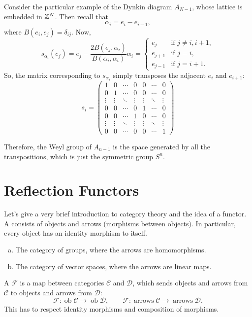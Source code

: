 \documentclass[oneside]{scrbook}
\begin{document}
Consider the particular example of the Dynkin diagram $A_{N-1}$, whose lattice is embedded in $\mathbb Z^N$. Then recall that
\[\alpha_i=e_i-e_{i+1},\]
where $B(e_i,e_j)=\delta_{ij}$. Now,
\[s_{\alpha_i}(e_j)=e_j-\frac{2B(e_j,\alpha_i)}{B(\alpha_i,\alpha_i)}\alpha_i=\begin{cases}
e_j & \text{if }j\neq i,i+1,\\
e_{j+1} & \text{if }j=i,\\
e_{j-1} & \text{if } j=i+1.
\end{cases}\]
So, the matrix corresponding to $s_{\alpha_i}$ simply transposes the adjacent $e_i$ and $e_{i+1}$:
\[s_i=\begin{pmatrix}
1 & 0 & \cdots & 0 & 0 & \cdots & 0\\
0 & 1 & \cdots & 0 & 0 & \cdots & 0\\
\vdots & \vdots & \ddots & \vdots & \vdots & \ddots & \vdots\\
0 & 0 & \cdots & 0 & 1 & \cdots & 0\\
0 & 0 & \cdots & 1 & 0 & \cdots & 0\\
\vdots & \vdots & \ddots & \vdots & \vdots & \ddots & \vdots\\
0 & 0 & \cdots & 0 & 0 & \cdots & 1
\end{pmatrix}\]

Therefore, the Weyl group of $A_{n-1}$ is the space generated by all the transpositions, which is just the symmetric group $S^n$.

\setcounter{section}{5}

\section{Reflection Functors}

Let's give a very brief introduction to category theory and the idea of a functor. A  consists of objects and arrows (morphisms between objects). In particular, every object has an identity morphism to itself. 
\begin{example}
\listhack
\begin{enumerate}[(a)]
    \item The category of groups, where the arrows are homomorphisms.
    \item The category of vector spaces, where the arrows are linear maps.
\end{enumerate}
\end{example}
A  $\mathcal{F}$ is a map between categories $\mathcal{C}$ and $\mathcal{D}$, which sends objects and arrows from $\mathcal{C}$ to objects and arrows from $\mathcal{D}$:
\[\mathcal{F}:\operatorname{ob}\mathcal{C}\to\operatorname{ob}\mathcal{D}, \qquad \mathcal{F}:\operatorname{arrows}\mathcal{C}\to\operatorname{arrows}\mathcal{D}.\]
This has to respect identity morphisms and composition of morphisms.
\end{document}
